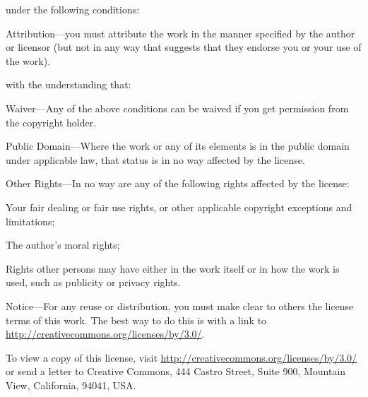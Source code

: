 \noindent
under the following conditions:

\begin{aosaitemize}
  \item Attribution---you must attribute the work in the manner
    specified by the author or licensor (but not in any way that
    suggests that they endorse you or your use of the work).
\end{aosaitemize}

\noindent
with the understanding that:

\begin{aosaitemize}
  \item Waiver---Any of the above conditions can be waived if you get
    permission from the copyright holder.
  \item Public Domain---Where the work or any of its elements is in
    the public domain under applicable law, that status is in no way
    affected by the license.

  \item Other Rights---In no way are any of the following rights
    affected by the license:
    \begin{aosaitemize2}

      \item Your fair dealing or fair use rights, or other applicable
        copyright exceptions and limitations;

      \item The author's moral rights;

      \item Rights other persons may have either in the work itself or
        in how the work is used, such as publicity or privacy rights.

    \end{aosaitemize2}

  \item Notice---For any reuse or distribution, you must make clear to
    others the license terms of this work. The best way to do this is
    with a link to \url{http://creativecommons.org/licenses/by/3.0/}.

\end{aosaitemize}

\noindent To view a copy of this license, visit
\url{http://creativecommons.org/licenses/by/3.0/} or send a letter to Creative
Commons, 444 Castro Street, Suite 900, Mountain View, California,
94041, USA.\\

